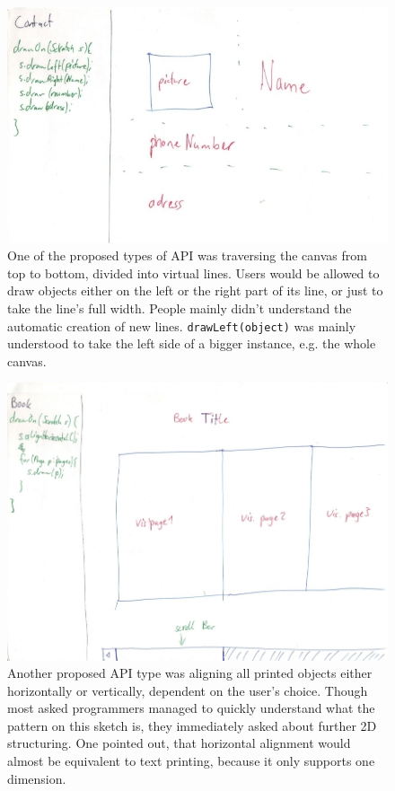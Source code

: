 \documentclass[english]{acm_proc_article-sp}
\begin{document}
\begin{figure}[h]
	\includegraphics[width=\linewidth]{img/sketches/026.jpg}
	\caption[Bad sketch example: Left-right pattern]{One of the proposed types of API was traversing the canvas from top to bottom, divided into virtual lines. 
Users would be allowed to draw objects either on the left or the right part of its line, or just to take the line's full width. 
People mainly didn't understand the automatic creation of new lines. 
\texttt{drawLeft(object)} was mainly understood to take the left side of a bigger instance, e.g. 
the whole canvas.}
	\label{bad-sketch_left-right}
\end{figure}

\begin{figure}
	\includegraphics[width=\linewidth]{img/sketches/032.jpg}
	\caption[Bad sketch example: Horizontal and vertical alignment]{Another proposed API type was aligning all printed objects either horizontally or vertically, dependent on the user's choice. 
Though most asked programmers managed to quickly understand what the pattern on this sketch is, they immediately asked about further 2D structuring. 
One pointed out, that horizontal alignment would almost be equivalent to text printing, because it only supports one dimension.}
	\label{bad-sketch_align-h-v}
\end{figure}
\end{document}
